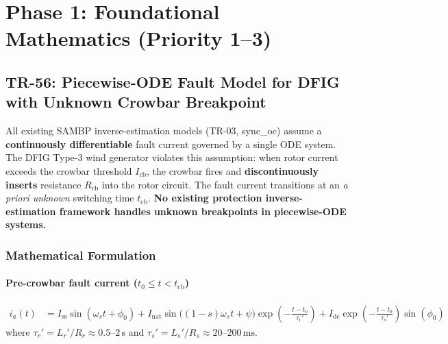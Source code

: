 \documentclass[12pt, a4paper]{report}
\begin{document}
\chapter{Phase 1: Foundational Mathematics (Priority 1--3)}

\section{TR-56: Piecewise-ODE Fault Model for DFIG with Unknown Crowbar Breakpoint}

\begin{tcolorbox}[gapbox, title={Research Gap — TR-56}]
All existing SAMBP inverse-estimation models (TR-03, sync\_oc) assume a \textbf{continuously differentiable} fault current governed by a single ODE system. The DFIG Type-3 wind generator violates this assumption: when rotor current exceeds the crowbar threshold $I_\mathrm{cb}$, the crowbar fires and \textbf{discontinuously inserts} resistance $R_\mathrm{cb}$ into the rotor circuit. The fault current transitions at an \textit{a priori unknown} switching time $t_\mathrm{cb}$. \textbf{No existing protection inverse-estimation framework handles unknown breakpoints in piecewise-ODE systems.}
\end{tcolorbox}

\subsection{Mathematical Formulation}

\subsubsection{Pre-crowbar fault current ($t_0 \le t < t_\mathrm{cb}$)}

\begin{tcolorbox}[mathbox]
\begin{align}
  i_a(t) &= I_\mathrm{ss}\sin(\omega_s t + \phi_0)
           + I_\mathrm{nat}\sin\!\bigl((1-s)\omega_s t + \psi\bigr)\exp\!\left(-\frac{t-t_0}{\tau_r'}\right)
           + I_\mathrm{dc}\exp\!\left(-\frac{t-t_0}{\tau_s'}\right)\sin(\phi_0)
\end{align}
where $\tau_r' = L_r'/R_r \approx 0.5$--$2\,\mathrm{s}$ and $\tau_s' = L_s'/R_s \approx 20$--$200\,\mathrm{ms}$.
\end{tcolorbox}
\end{document}

